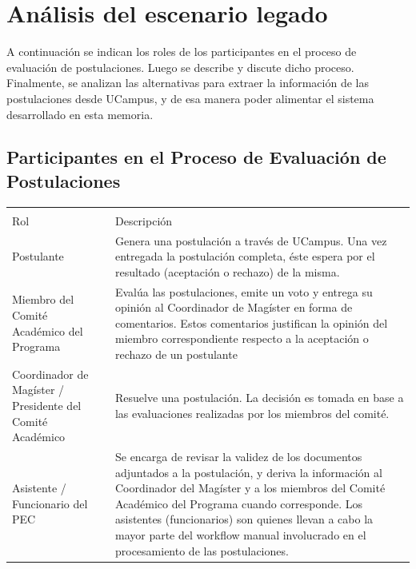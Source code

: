\chapter{Análisis del escenario legado}

A continuación se indican los roles de los participantes en el proceso de
evaluación de postulaciones. Luego se describe y discute dicho proceso.
Finalmente, se analizan las alternativas para extraer la información de las
postulaciones desde UCampus, y de esa manera poder alimentar el sistema
desarrollado en esta memoria.

\section{Participantes en el Proceso de Evaluación de Postulaciones}

\begin{table}[ht]
    \begin{center}
        \begin{tabular}{|l|l|}
            \hline \\
            Rol & Descripción \\ \hline

            Postulante & Genera una postulación a través de UCampus. Una vez
            entregada la postulación completa, éste espera por el resultado
            (aceptación o rechazo) de la misma.\\ \hline

            Miembro del Comité Académico del Programa & Evalúa las
            postulaciones, emite un voto y entrega su opinión al Coordinador de
            Magíster en forma de comentarios. Estos comentarios justifican la
            opinión del miembro correspondiente respecto a la aceptación o
            rechazo de un postulante \\ \hline

            Coordinador de Magíster / Presidente del Comité Académico & Resuelve
            una postulación. La decisión es tomada en base a las evaluaciones
            realizadas por los miembros del comité. \\ \hline

            Asistente / Funcionario del PEC & Se encarga de revisar la validez
            de los documentos adjuntados a la postulación, y deriva la
            información al Coordinador del Magíster y a los miembros del Comité
            Académico del Programa cuando corresponde. Los asistentes
            (funcionarios) son quienes llevan a cabo la mayor parte del workflow
            manual involucrado en el procesamiento de las postulaciones. \\ \hline
        \end{tabular}
    \end{center}
\end{table}


